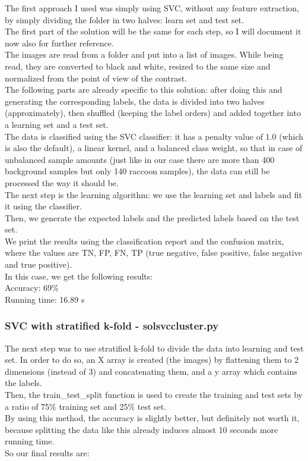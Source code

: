 \documentclass[a4paper,10pt]{article}
\newcommand\tab[1][0.5cm]{\hspace*{#1}}
\begin{document}
  \tab The first approach I used was simply using SVC, without any feature extraction, by simply dividing the folder in two halves: learn set and test set. \\
  \tab The first part of the solution will be the same for each step, so I will document it now also for further reference. \\
  \tab The images are read from a folder and put into a list of images. While being read, they are converted to black and white, resized to the same size and normalized from the point of view of the contrast. \\
  \tab The following parts are already specific to this solution: after doing this and generating the corresponding labels, the data is divided into two halves (approximately), then shuffled (keeping the label orders) and added together into a learning set and a test set. \\
  \tab The data is classified using the SVC classifier: it has a penalty value of 1.0 (which is also the default), a linear kernel, and a balanced class weight, so that in case of unbalanced sample amounts (just like in our case there are more than 400 background samples but only 140 raccoon samples), the data can still be processed the way it should be. \\
  \tab The next step is the learning algorithm: we use the learning set and labels and fit it using the classifier. \\
  \tab Then, we generate the expected labels and the predicted labels based on the test set. \\
  \tab We print the results using the classification report and the confusion matrix, where the values are TN, FP, FN, TP (true negative, false positive, false negative and true positive).\\
  \tab In this case, we get the following results: \\
  
  Accuracy: 69\% \\ 
  \tab Running time: 16.89 s
  
  \subsubsection{SVC with stratified k-fold - solsvccluster.py}
  
  \tab The next step was to use stratified k-fold to divide the data into learning and test set. In order to do so, an X array is created (the images) by flattening them to 2 dimensions (instead of 3) and concatenating them, and a y array which contains the labels. \\
  \tab Then, the train\_test\_split function is used to create the training and test sets by a ratio of 75\% training set and 25\% test set. \\ 
  \tab By using this method, the accuracy is slightly better, but definitely not worth it, because splitting the data like this already induces almost 10 seconds more running time. \\
  \tab So our final results are: \\
  
\end{document}
